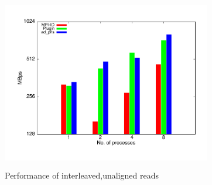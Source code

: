 \begin{figure}[!t]
\centering
\includegraphics[width=3.6in,height=3.0in]{interleaved_r}
\caption{Performance of interleaved,unaligned reads}
\label{read_interleaved}
\end{figure}


